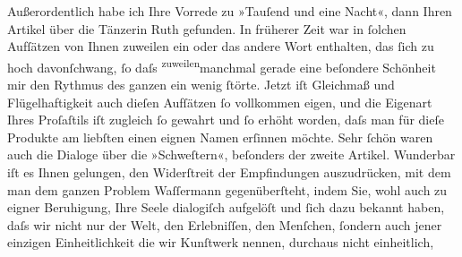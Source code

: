 \begin{ledgroupsized}[t]{13cm}
               Außerordentlich habe ich Ihre Vorrede zu »Tauſend und eine Nacht«,
               dann Ihren Artikel über die
               Tänzerin Ruth gefunden. In früherer Zeit war
               in ſolchen Aufſätzen von Ihnen zuweilen ein oder das andere Wort enthalten, das ſich
               zu hoch davonſchwang, ſo daſs \substVorne{}\textsuperscript{zuweilen}{\allowbreak}\substDazwischen{}manchmal\substHinten{} gerade eine beſondere Schönheit mir den Rythmus des ganzen ein wenig ſtörte.
               Jetzt iſt Gleichmaß und {\pb}Flügelhaftigkeit auch dieſen
               Aufſätzen ſo vollkommen eigen,  und die
               Eigenart  Ihres Proſaſtils iſt zugleich ſo gewahrt
               und ſo erhöht worden, daſs man für dieſe Produkte am liebſten einen eignen Namen
               erſinnen möchte. Sehr ſchön waren auch die Dialoge über die »Schweſtern«, beſonders der zweite Artikel. Wunderbar iſt es Ihnen gelungen,
               den Widerſtreit der Empfindungen auszudrücken, mit dem man dem ganzen Problem {\pb}Waſſermann gegenüberſteht, indem Sie, wohl
               auch zu eigner Beruhigung, Ihre Seele dialogiſch aufgelöſt und ſich dazu bekannt
               haben, daſs wir nicht nur der Welt, den Erlebniſſen, den Menſchen, ſondern auch jener
               einzigen Einheitlichkeit die wir Kunſtwerk nennen, durchaus nicht einheitlich,

\end{ledgroupsized}

